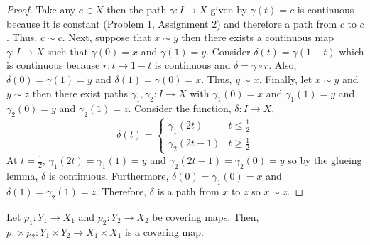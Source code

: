 \documentclass[12pt]{extarticle}
\begin{document}
\begin{proof}
Take any $c \in X$ then the path $\gamma : I \to X$ given by $\gamma(t) = c$ is continuous because it is constant (Problem 1, Assignment 2) and therefore a path from $c$ to $c$. Thus, $c \sim c$. Next, suppose that $x \sim y$ then there exists a continuous map $\gamma : I \to X$ such that $\gamma(0) = x$ and $\gamma(1) = y$. Consider $\delta(t) = \gamma(1 - t)$ which is continuous because $r: t \mapsto 1 - t$ is continuous and $\delta = \gamma \circ r$. Also, $\delta(0) = \gamma(1) = y$ and $\delta(1) = \gamma(0) = x$. Thus, $y \sim x$. Finally, let $x \sim y$ and $y \sim z$ then there exist paths $\gamma_1, \gamma_2 : I \to X$ with $\gamma_1(0) = x$ and $\gamma_1(1) = y$ and $\gamma_2(0) = y$ and $\gamma_2(1) = z$. Consider the function, $\delta : I \to X$,
\[\delta(t) = 
\begin{cases}
\gamma_1(2t) & t \le \frac{1}{2} \\
\gamma_2(2t - 1) & t \ge \frac{1}{2} 
\end{cases}
\]
At $t = \frac{1}{2}$, $\gamma_1(2t) = \gamma_1(1) = y$ and $\gamma_2(2t - 1) = \gamma_2(0) = y$ so by the glueing lemma, $\delta$ is continuous. Furthermore, $\delta(0) = \gamma_1(0) = x$ and $\delta(1) = \gamma_2(1) = z$. Therefore, $\delta$ is a path from $x$ to $z$ so $x \sim z$. 
    
\end{proof}

\begin{lemma} \label{prods}
Let $p_1 : Y_1 \to X_1$ and $p_2 : Y_2 \to X_2$ be covering maps. Then, $p_1 \times p_2 : Y_1 \times Y_2 \to X_1 \times X_1$ is a covering map.
\end{lemma}
\end{document}
